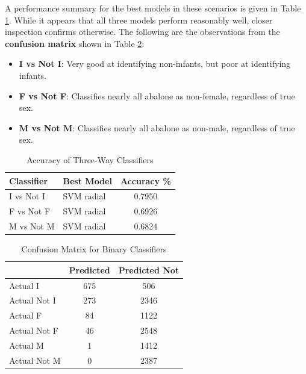 \documentclass[11pt, a4paper]{article}
\begin{document}
    A performance summary for the best models in these scenarios is given in Table \ref{binary}. While it appears that all three models perform reasonably well, closer inspection confirms otherwise. The following are the observations from the \textbf{confusion matrix} shown in Table \ref{cms}:

    \begin{itemize}
        \item \textbf{I vs Not I}: Very good at identifying non-infants, but poor at identifying infants.
        \item \textbf{F vs Not F}: Classifies nearly all abalone as non-female, regardless of true sex.
        \item \textbf{M vs Not M}: Classifies nearly all abalone as non-male, regardless of true sex.
    \end{itemize}  

    \begin{table}[ht]
        \centering
        \begin{tabular}{|l|l|c|}
            \hline
            Classifier  & Best Model    & Accuracy \% \\
            \hline
            I vs Not I  & SVM radial    & 0.7950 \\
            F vs Not F  & SVM radial    & 0.6926 \\
            M vs Not M  & SVM radial    & 0.6824 \\
            \hline
        \end{tabular}
        \caption{Accuracy of Three-Way Classifiers}
        \label{binary}
    \end{table}

    \begin{table}
        \centering
        \begin{tabular}{|l|c|c|}
            \hline
                            & Predicted & Predicted Not \\
            \hline
            Actual I        & 675       & 506 \\
            Actual Not I    & 273       & 2346 \\
            \hline
            Actual F        & 84        & 1122 \\
            Actual Not F    & 46        & 2548 \\
            \hline
            Actual M        & 1         & 1412 \\
            Actual Not M    & 0         & 2387 \\
            \hline           
        \end{tabular}
        \caption{Confusion Matrix for Binary Classifiers}
        \label{cms}
    \end{table}
\end{document}
